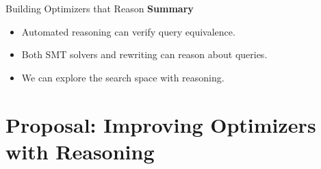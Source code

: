 \documentclass{beamer}
\begin{document}
  \begin{frame}{Building Optimizers that Reason}
    \textbf{Summary}
    \begin{itemize}
      \item Automated reasoning can verify query equivalence.
      \item Both SMT solvers and rewriting can reason about queries.
      \item We can explore the search space with reasoning.
    \end{itemize}
  \end{frame}

  \section{Proposal: Improving Optimizers with Reasoning}
\end{document}
